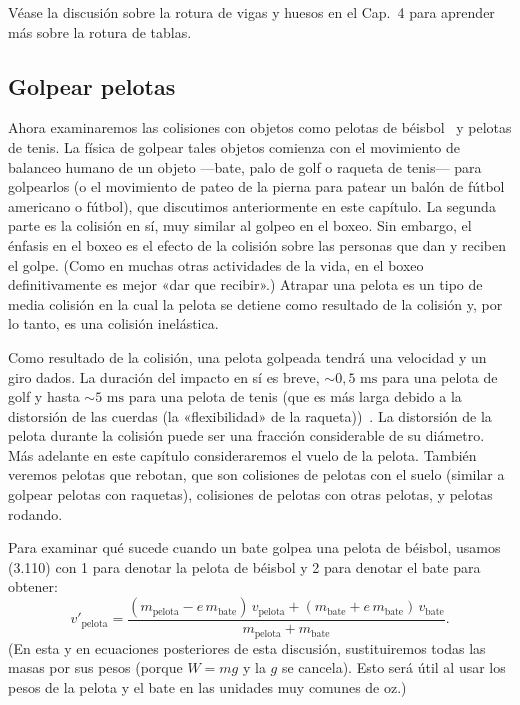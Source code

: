\documentclass[12pt]{book}
\begin{document}
Véase la discusión sobre la rotura de vigas y huesos en el Cap.~4 para aprender más sobre la rotura de tablas.

\subsection{Golpear pelotas}

Ahora examinaremos las colisiones con objetos como pelotas de béisbol~\cite{ref2,ref30,ref33,ref127,ref128,ref137} y pelotas de tenis. La física de golpear tales objetos comienza con el movimiento de balanceo humano de un objeto ---bate, palo de golf o raqueta de tenis--- para golpearlos (o el movimiento de pateo de la pierna para patear un balón de fútbol americano o fútbol), que discutimos anteriormente en este capítulo. La segunda parte es la colisión en sí, muy similar al golpeo en el boxeo. Sin embargo, el énfasis en el boxeo es el efecto de la colisión sobre las personas que dan y reciben el golpe. (Como en muchas otras actividades de la vida, en el boxeo definitivamente es mejor «dar que recibir».) Atrapar una pelota es un tipo de media colisión en la cual la pelota se detiene como resultado de la colisión y, por lo tanto, es una colisión inelástica.

Como resultado de la colisión, una pelota golpeada tendrá una velocidad y un giro dados. La duración del impacto en sí es breve, $\sim 0{,}5\text{ ms}$ para una pelota de golf y hasta $\sim 5\text{ ms}$ para una pelota de tenis (que es más larga debido a la distorsión de las cuerdas (la «flexibilidad» de la raqueta))~\cite{ref36}. La distorsión de la pelota durante la colisión puede ser una fracción considerable de su diámetro. Más adelante en este capítulo consideraremos el vuelo de la pelota. También veremos pelotas que rebotan, que son colisiones de pelotas con el suelo (similar a golpear pelotas con raquetas), colisiones de pelotas con otras pelotas, y pelotas rodando.

Para examinar qué sucede cuando un bate golpea una pelota de béisbol, usamos (3.110) con 1 para denotar la pelota de béisbol y 2 para denotar el bate para obtener:
\begin{equation}
v'_{\text{pelota}} = \frac{(m_{\text{pelota}} - e\,m_{\text{bate}})\,v_{\text{pelota}} + (m_{\text{bate}} + e\,m_{\text{bate}})\,v_{\text{bate}}}{m_{\text{pelota}} + m_{\text{bate}}}.
\label{eq:3.126}
\end{equation}
(En esta y en ecuaciones posteriores de esta discusión, sustituiremos todas las masas por sus pesos (porque $W = mg$ y la $g$ se cancela). Esto será útil al usar los pesos de la pelota y el bate en las unidades muy comunes de oz.)
\end{document}
